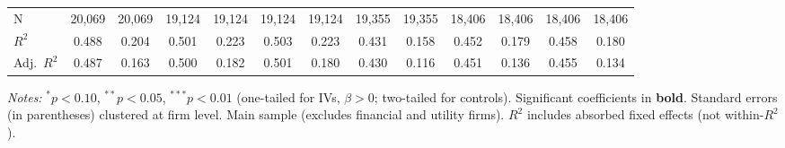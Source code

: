 \documentclass[11pt,a4paper]{article}
\begin{document}
\begin{table}[htbp]
\begin{tabular}{lcccccccccccc}
N & 20,069 & 20,069 & 19,124 & 19,124 & 19,124 & 19,124 & 19,355 & 19,355 & 18,406 & 18,406 & 18,406 & 18,406 \\
$R^2$ & 0.488 & 0.204 & 0.501 & 0.223 & 0.503 & 0.223 & 0.431 & 0.158 & 0.452 & 0.179 & 0.458 & 0.180 \\
Adj.~$R^2$ & 0.487 & 0.163 & 0.500 & 0.182 & 0.501 & 0.180 & 0.430 & 0.116 & 0.451 & 0.136 & 0.455 & 0.134 \\
\bottomrule
\end{tabular}
\begin{minipage}{\linewidth}
\vspace{2pt}\scriptsize
\textit{Notes:} $^{*}p<0.10$, $^{**}p<0.05$, $^{***}p<0.01$ (one-tailed for IVs, $\beta > 0$; two-tailed for controls).
 Significant coefficients in \textbf{bold}.
 Standard errors (in parentheses) clustered at firm level.
 Main sample (excludes financial and utility firms).
 $R^2$ includes absorbed fixed effects (not within-$R^2$).
\end{minipage}
\end{table}
\clearpage
\end{document}
